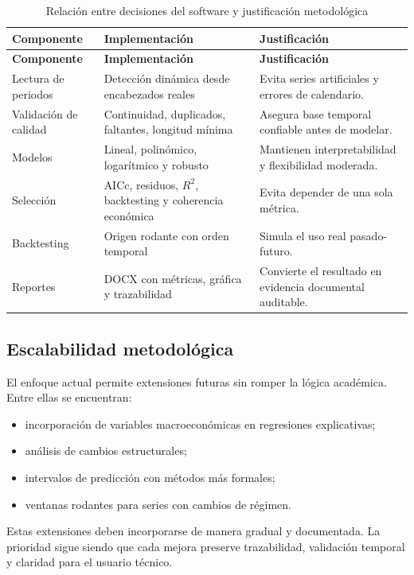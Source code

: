 \begin{longtable}{p{}p{}p{}}
\caption{Relación entre decisiones del software y justificación metodológica}
\label{tab:implementacion_metodologia}\\
\toprule
\textbf{Componente} & \textbf{Implementación} & \textbf{Justificación} \\
\midrule
\endfirsthead
\toprule
\textbf{Componente} & \textbf{Implementación} & \textbf{Justificación} \\
\midrule
\endhead
Lectura de periodos & Detección dinámica desde encabezados reales & Evita series artificiales y errores de calendario. \\
Validación de calidad & Continuidad, duplicados, faltantes, longitud mínima & Asegura base temporal confiable antes de modelar. \\
Modelos & Lineal, polinómico, logarítmico y robusto & Mantienen interpretabilidad y flexibilidad moderada. \\
Selección & AICc, residuos, \(R^2\), backtesting y coherencia económica & Evita depender de una sola métrica. \\
Backtesting & Origen rodante con orden temporal & Simula el uso real pasado-futuro. \\
Reportes & DOCX con métricas, gráfica y trazabilidad & Convierte el resultado en evidencia documental auditable. \\
\bottomrule
\end{longtable}

\subsection{Escalabilidad metodológica}

El enfoque actual permite extensiones futuras sin romper la lógica académica. Entre ellas se encuentran:

\begin{itemize}
    \item incorporación de variables macroeconómicas en regresiones explicativas;
    \item análisis de cambios estructurales;
    \item intervalos de predicción con métodos más formales;
    \item ventanas rodantes para series con cambios de régimen.
\end{itemize}

Estas extensiones deben incorporarse de manera gradual y documentada. La prioridad sigue siendo que cada mejora preserve trazabilidad, validación temporal y claridad para el usuario técnico.
